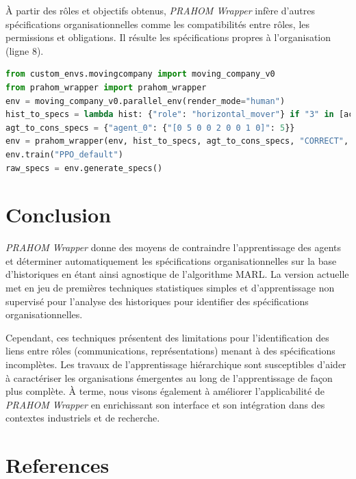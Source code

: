 \documentclass[demonstration]{jfsma}
\begin{document}
À partir des rôles et objectifs obtenus, \emph{PRAHOM Wrapper} infère d'autres spécifications organisationnelles comme les compatibilités entre rôles, les permissions et obligations. Il résulte les spécifications propres à l'organisation (ligne 8).

\begin{lstlisting}[language=Python, caption={Utilisation synthétique de \emph{PRAHOM Wrapper} pour \emph{Moving Company}}, label={lst:wrapper_mc}]
from custom_envs.movingcompany import moving_company_v0
from prahom_wrapper import prahom_wrapper
env = moving_company_v0.parallel_env(render_mode="human")
hist_to_specs = lambda hist: {"role": "horizontal_mover"} if "3" in [act for obs, act in hist.items()] else None
agt_to_cons_specs = {"agent_0": {"[0 5 0 0 2 0 0 1 0]": 5}}
env = prahom_wrapper(env, hist_to_specs, agt_to_cons_specs, "CORRECT", ["sequence_clustering"], ["role", "goals"], ["dendogram", "PCA"])
env.train("PPO_default")
raw_specs = env.generate_specs()
\end{lstlisting}

\section{Conclusion}

\emph{PRAHOM Wrapper} donne des moyens de contraindre l'apprentissage des agents et déterminer automatiquement les spécifications organisationnelles sur la base d'historiques en étant ainsi agnostique de l'algorithme MARL.
La version actuelle met en jeu de premières techniques statistiques simples et d'apprentissage non supervisé pour l'analyse des historiques pour identifier des spécifications organisationnelles.

Cependant, ces techniques présentent des limitations pour l'identification des liens entre rôles (communications, représentations) menant à des spécifications incomplètes.
Les travaux de l'apprentissage hiérarchique sont susceptibles d'aider à caractériser les organisations émergentes au long de l’apprentissage de façon plus complète.
À terme, nous visons également à améliorer l'applicabilité de \emph{PRAHOM Wrapper} en enrichissant son interface et son intégration dans des contextes industriels et de recherche.






\section*{References}
\small


\end{document}
